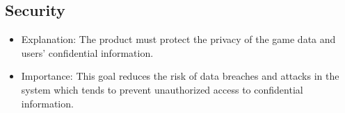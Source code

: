 \documentclass{article}
\begin{document}
\subsection{Security}
\begin{itemize}
\item Explanation: The product must protect the privacy of the game data and users' confidential information. 
\item Importance: This goal reduces the risk of data breaches and attacks in the system which tends to prevent unauthorized access to confidential information. 
\end{itemize}
\end{document}
